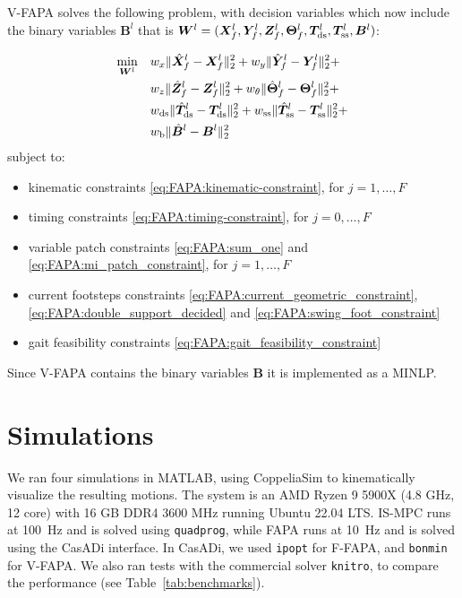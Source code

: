 V-FAPA solves the following problem, with decision variables which now include
the binary variables $\bm{B}^{l}$ that is ${\bm{W}}^l = (\bm{X}_f^l, \bm{Y}_f^l, \bm{Z}_f^l, \bm{\Theta}_f^l, \bm{T}_{\rm ds}^l, \bm{T}_{\rm ss}^l, \bm{B}^{l})$:
\begin{braced}
    \begin{equation*}
        \begin{split}
            \min_{{\bm{W}}^l} \quad
            & w_x \| \hat{\bm{X}}_f^l - \bm{X}_f^l \|_2^2 + w_y \| \hat{\bm{Y}}_f^l - \bm{Y}_f^l \|_2^2 + \\& w_z \| \hat{\bm{Z}}_f^l - \bm{Z}_f^l \|_2^2 + w_{\theta} \| \hat{\bm{\Theta}}_f^l - \bm{\Theta}_f^l \|_2^2 + \\& w_{\rm ds} \| \hat{\bm{T}}_{\rm ds}^l - \bm{T}_{\rm ds}^l \|_2^2 + w_{\rm ss} \| \hat{\bm{T}}_{\rm ss}^l - \bm{T}_{\rm ss}^l \|_2^2 +  \\&
            w_{\rm b} \| \hat{\bm{B}}^l - \bm{B}^l \|_2^2
        \end{split}
    \end{equation*}
    \hspace{0.25cm} subject to:
    \begin{itemize}
        \item kinematic constraints \eqref{eq:FAPA:kinematic-constraint}, for $j=1,\dots,F$
        \item timing constraints \eqref{eq:FAPA:timing-constraint}, for $j=0,\dots,F$
        \item variable patch constraints \eqref{eq:FAPA:sum_one} and \eqref{eq:FAPA:mi_patch_constraint}, for $j=1,\dots,F$
        \item current footsteps constraints \eqref{eq:FAPA:current_geometric_constraint}, \eqref{eq:FAPA:double_support_decided} and \eqref{eq:FAPA:swing_foot_constraint}
        \item gait feasibility constraints \eqref{eq:FAPA:gait_feasibility_constraint}
    \end{itemize}
\end{braced}

\medskip

Since V-FAPA contains the binary variables $\bm{B}$ it is implemented as a MINLP.

\section{Simulations}
\label{sec:FAPA:Simulations}
We ran four simulations in MATLAB, using CoppeliaSim to kinematically
visualize the resulting motions. The system is an AMD Ryzen 9 5900X
(4.8 GHz, 12 core) with 16 GB DDR4 3600 MHz running Ubuntu 22.04 LTS. IS-MPC
runs at 100~Hz and is solved using \texttt{quadprog}, while FAPA runs at
10~Hz and is solved using the CasADi interface. In CasADi, we used
\texttt{ipopt} for F-FAPA, and \texttt{bonmin} for V-FAPA. We also ran tests
with the commercial solver \texttt{knitro}, to compare the performance
(see Table~\ref{tab:benchmarks}).

